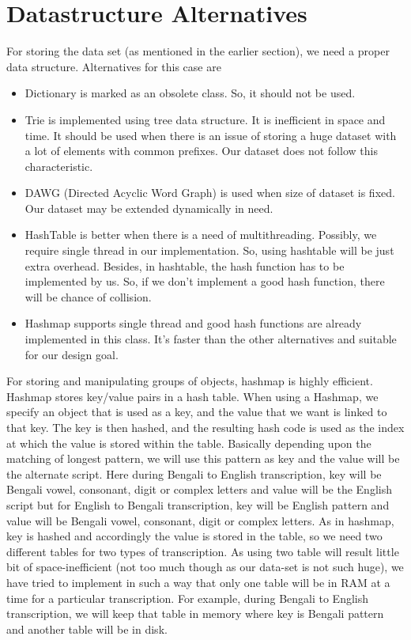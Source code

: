 \documentclass[12pt,oneside,openany,a4paper]{book}
\begin{document}
\section{Datastructure Alternatives}
For storing the data set (as mentioned in the earlier section), we need a proper data structure.  Alternatives for this case are
\begin{itemize}
\item{Dictionary is marked as an obsolete class. So, it should not be used.}
\item{Trie is implemented using tree data structure. It is inefficient in space and time. It should be used when there is an issue of storing a huge dataset with a lot of elements with common prefixes. Our dataset does not follow this characteristic.}
\item{DAWG (Directed Acyclic Word Graph) is used when size of dataset is fixed. Our dataset may be extended dynamically in need.}
\item{HashTable is better when there is a need of multithreading. Possibly, we require single thread in our implementation. So, using hashtable will be just extra overhead. Besides, in hashtable, the hash function has to be implemented by us. So, if we don't implement a good hash function, there will be chance of collision.}
\item{Hashmap supports single thread and good hash functions are already implemented in this class. It’s faster than the other alternatives and suitable for our design goal.}
\end{itemize}
\par
For storing and manipulating groups of objects, hashmap is highly efficient.  Hashmap stores key/value pairs in a hash table. When using a Hashmap, we specify an object that is used as a key, and the value that we want is linked to that key. The key is then hashed, and the resulting hash code is used as the index at which the value is stored within the table. Basically depending upon the matching of longest pattern, we will use this pattern as key and the value will be the alternate script. Here during Bengali to English transcription, key will be Bengali vowel, consonant, digit or complex letters and value will be the English script but for English to Bengali transcription, key will be English pattern and value will be Bengali vowel, consonant, digit or complex letters. As in hashmap, key is hashed and accordingly the value is stored in the table, so we need two different tables for two types of transcription. As using two table will result little bit of space-inefficient (not too much though as our data-set is not such huge), we have tried to implement in such a way that only one table will be in RAM at a time for a particular transcription. For example, during Bengali to English transcription, we will keep that table in memory where key is Bengali pattern and another table will be in disk.
\end{document}
